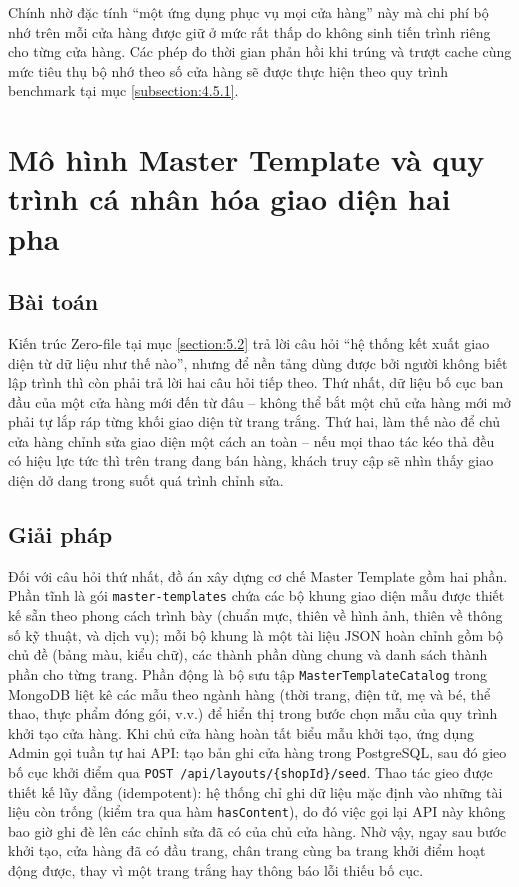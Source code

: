 \documentclass[../main.tex]{subfiles}
\begin{document}
Chính nhờ đặc tính ``một ứng dụng phục vụ mọi cửa hàng'' này mà chi phí bộ nhớ trên mỗi cửa hàng được giữ ở mức rất thấp do không sinh tiến trình riêng cho từng cửa hàng. Các phép đo thời gian phản hồi khi trúng và trượt cache cùng mức tiêu thụ bộ nhớ theo số cửa hàng sẽ được thực hiện theo quy trình benchmark tại mục \ref{subsection:4.5.1}.

\section{Mô hình Master Template và quy trình cá nhân hóa giao diện hai pha}
\label{section:5.3}

\subsection{Bài toán}
\label{subsection:5.3.1}

Kiến trúc Zero-file tại mục \ref{section:5.2} trả lời câu hỏi ``hệ thống kết xuất giao diện từ dữ liệu như thế nào'', nhưng để nền tảng dùng được bởi người không biết lập trình thì còn phải trả lời hai câu hỏi tiếp theo. Thứ nhất, dữ liệu bố cục ban đầu của một cửa hàng mới đến từ đâu -- không thể bắt một chủ cửa hàng mới mở phải tự lắp ráp từng khối giao diện từ trang trắng. Thứ hai, làm thế nào để chủ cửa hàng chỉnh sửa giao diện một cách an toàn -- nếu mọi thao tác kéo thả đều có hiệu lực tức thì trên trang đang bán hàng, khách truy cập sẽ nhìn thấy giao diện dở dang trong suốt quá trình chỉnh sửa.

\subsection{Giải pháp}
\label{subsection:5.3.2}

Đối với câu hỏi thứ nhất, đồ án xây dựng cơ chế Master Template gồm hai phần. Phần tĩnh là gói \texttt{master-templates} chứa các bộ khung giao diện mẫu được thiết kế sẵn theo phong cách trình bày (chuẩn mực, thiên về hình ảnh, thiên về thông số kỹ thuật, và dịch vụ); mỗi bộ khung là một tài liệu JSON hoàn chỉnh gồm bộ chủ đề (bảng màu, kiểu chữ), các thành phần dùng chung và danh sách thành phần cho từng trang. Phần động là bộ sưu tập \texttt{MasterTemplateCatalog} trong MongoDB liệt kê các mẫu theo ngành hàng (thời trang, điện tử, mẹ và bé, thể thao, thực phẩm đóng gói, v.v.) để hiển thị trong bước chọn mẫu của quy trình khởi tạo cửa hàng. Khi chủ cửa hàng hoàn tất biểu mẫu khởi tạo, ứng dụng Admin gọi tuần tự hai API: tạo bản ghi cửa hàng trong PostgreSQL, sau đó gieo bố cục khởi điểm qua \texttt{POST /api/layouts/\{shopId\}/seed}. Thao tác gieo được thiết kế lũy đẳng (idempotent): hệ thống chỉ ghi dữ liệu mặc định vào những tài liệu còn trống (kiểm tra qua hàm \texttt{hasContent}), do đó việc gọi lại API này không bao giờ ghi đè lên các chỉnh sửa đã có của chủ cửa hàng. Nhờ vậy, ngay sau bước khởi tạo, cửa hàng đã có đầu trang, chân trang cùng ba trang khởi điểm hoạt động được, thay vì một trang trắng hay thông báo lỗi thiếu bố cục.
\end{document}
